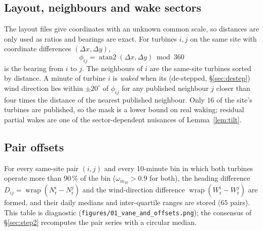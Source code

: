 \documentclass[11pt,a4paper]{article}
\theoremstyle{remark}
\newcommand{\wrap}{\operatorname{wrap}}
\newcommand{\dg}{^{\circ}}
\newcommand{\code}[1]{\texttt{#1}}
\newcommand{\Wr}{W_{\mathrm{r}}}
\newcommand{\Nr}{N_{\mathrm{r}}}
\begin{document}
\subsection{Layout, neighbours and wake sectors}\label{sec:wake}
The layout files give coordinates with an unknown common scale, so distances are
only used as ratios and bearings are exact. For turbines $i,j$ on the same site
with coordinate differences $(\Delta x,\Delta y)$,
\begin{equation}
  \phi_{ij} = \operatorname{atan2}(\Delta x, \Delta y) \bmod 360
  \label{eq:bearing}
\end{equation}
is the bearing from $i$ to $j$. The neighbours of $i$ are the same-site turbines
sorted by distance. A minute of turbine $i$ is \emph{waked} when its
(de-stepped, \S\ref{sec:destep}) wind direction lies within $\pm20\dg$ of
$\phi_{ij}$ for any published neighbour $j$ closer than four times the distance
of the nearest published neighbour. Only $16$ of the site's turbines are
published, so the mask is a lower bound on real waking; residual partial wakes
are one of the sector-dependent nuisances of Lemma~\ref{lem:tilt}.

\subsection{Pair offsets}
For every same-site pair $(i,j)$ and every 10-minute bin in which both turbines
operate more than $90\,\%$ of the bin ($\omega_{m_{10}}>0.9$ for both), the
heading difference $D_{ij}=\wrap(\Nr^i-\Nr^j)$ and the wind-direction
difference $\wrap(\Wr^i-\Wr^j)$ are formed, and their daily medians and
inter-quartile ranges are stored ($65$ pairs). This table is diagnostic
(\code{figures/01\_vane\_and\_offsets.png}); the consensus of \S\ref{sec:step2}
recomputes the pair series with a circular median.
\end{document}
